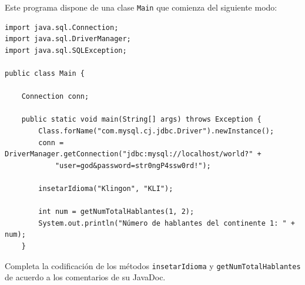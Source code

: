 \documentclass[
    12pt,
    a4paper,
    addpoints,
    answers,
    convocatoria=ord,
    titulacion=NoCD,
    curso=2025/2026,
]{db-exam}
\begin{document}
\begin{questions}
Este programa dispone de una clase \texttt{Main} que comienza del siguiente modo:

\begin{verbatim}
import java.sql.Connection;
import java.sql.DriverManager;
import java.sql.SQLException;

public class Main {

    Connection conn;

    public static void main(String[] args) throws Exception {
        Class.forName("com.mysql.cj.jdbc.Driver").newInstance();
        conn = DriverManager.getConnection("jdbc:mysql://localhost/world?" +
            "user=god&password=str0ngP4ssw0rd!");

        insetarIdioma("Klingon", "KLI");

        int num = getNumTotalHablantes(1, 2);
        System.out.println("Número de hablantes del continente 1: " + num);
    }
\end{verbatim}

Completa la codificación de los métodos \texttt{insetarIdioma} y \texttt{getNumTotalHablantes} de acuerdo a los comentarios de su JavaDoc.

\end{questions}
\end{document}
